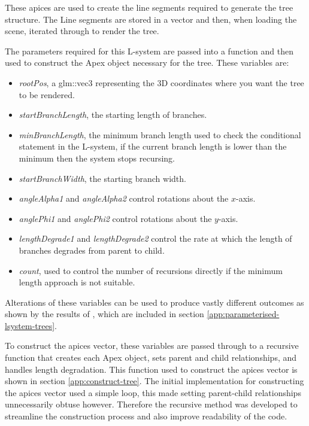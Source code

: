 \documentclass[final]{cmpreport}
\begin{document}
These apices are used to create the line segments required to generate the tree structure. The 
Line segments are stored in a vector and then, when loading the scene, iterated through to render the tree.

The parameters required for this L-system are passed into a function and then used to construct 
the Apex object necessary for the tree. These variables are:

\begin{itemize}
    \item \emph{rootPos}, a glm::vec3 representing the 3D coordinates where you want the tree to be rendered.
    \item \emph{startBranchLength}, the starting length of branches.
    \item \emph{minBranchLength}, the minimum branch length used to check the conditional statement in the 
          L-system, if the current branch length is lower than the minimum then the system stops recursing.
    \item \emph{startBranchWidth}, the starting branch width.
    \item \emph{angleAlpha1} and \emph{angleAlpha2} control rotations about the $x$-axis.
    \item \emph{anglePhi1} and \emph{anglePhi2} control rotations about the $y$-axis.
    \item \emph{lengthDegrade1} and \emph{lengthDegrade2} control the rate at which the length of branches 
          degrades from parent to child.
    \item \emph{count}, used to control the number of recursions directly if the minimum length approach 
          is not suitable.
\end{itemize}

Alterations of these variables can be used to produce vastly different outcomes as shown by the 
results of \cite{prusinkiewicz1996systems}, which are included in section \ref{app:parameterised-lsystem-trees}.

To construct the apices vector, these variables are passed through to a recursive function that 
creates each Apex object, sets parent and child relationships, and handles length degradation.
This function used to construct the apices vector is shown in section \ref{app:construct-tree}. 
The initial implementation for constructing the apices vector used a simple loop, this made 
setting parent-child relationships unnecessarily obtuse however. Therefore the recursive method 
was developed to streamline the construction process and also improve readability of the code.
\end{document}
